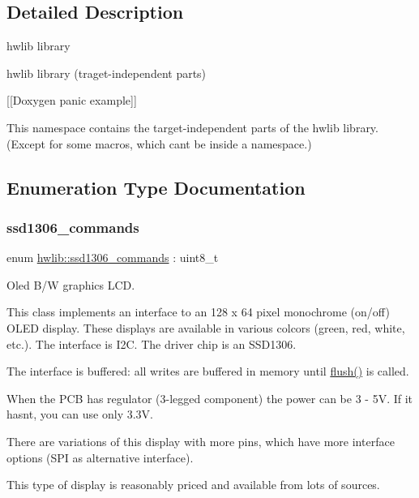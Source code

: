 \subsection{Detailed Description}
hwlib library 

hwlib library (traget-\/independent parts)

\mbox{[}\mbox{[}Doxygen panic example\mbox{]}\mbox{]}

This namespace contains the target-\/independent parts of the hwlib library. (Except for some macro\textquotesingle{}s, which can\textquotesingle{}t be inside a namespace.) 

\subsection{Enumeration Type Documentation}
\mbox{\label{namespacehwlib_a9dcd26ad4dc21c1a72b57fb76f65e811}} 
\subsubsection{\texorpdfstring{ssd1306\+\_\+commands}{ssd1306\_commands}}
{\footnotesize\ttfamily enum \hyperlink{namespacehwlib_a9dcd26ad4dc21c1a72b57fb76f65e811}{hwlib\+::ssd1306\+\_\+commands} \+: uint8\+\_\+t\hspace{0.3cm}{\ttfamily [strong]}}



Oled B/W graphics L\+CD. 

This class implements an interface to an 128 x 64 pixel monochrome (on/off) O\+L\+ED display. These displays are available in various colcors (green, red, white, etc.). The interface is I2C. The driver chip is an S\+S\+D1306.

The interface is buffered\+: all writes are buffered in memory until \hyperlink{namespacehwlib_a648fe94ca9899747a632c23f97007732}{flush()} is called.

When the P\+CB has regulator (3-\/legged component) the power can be 3 -\/ 5V. If it hasn\textquotesingle{}t, you can use only 3.\+3V.

There are variations of this display with more pins, which have more interface options (S\+PI as alternative interface).

This type of display is reasonably priced and available from lots of sources.

